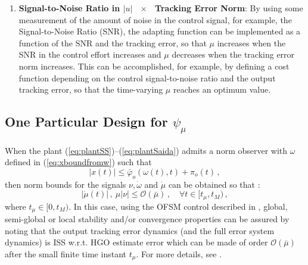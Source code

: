 \documentclass[letterpaper, 10 pt, journal, twocolumn]{IEEEtran}  %
\theoremstyle{plain}
\theoremstyle{definition}
\theoremstyle{remark}
\begin{document}
\begin{enumerate}
\begin{enumerate}
\item {\bf Signal-to-Noise Ratio in $|u|$ \  $\times$ \ Tracking Error Norm}: By using some measurement of the amount of noise in the control signal, for example, the Signal-to-Noise Ratio (SNR), the adapting function can be implemented as a function of the SNR and the tracking error, so that $\mu$ increases when the SNR in the control effort increases and $\mu$ decreases when the tracking error norm increases. This can be accomplished, for example, by defining a cost function depending on the control signal-to-noise ratio and the output tracking error, so that the time-varying $\mu$ reaches an optimum value.
\end{enumerate}

 
\end{enumerate}



\subsection{One Particular Design for $\psi_\mu$}

When the plant (\ref{eq:plantSS})--(\ref{eq:plantSaida}) admits a norm observer with $\omega$ defined in (\ref{eq:xboundfromw}) such that 
%
\begin{equation}
|x(t)| \leq \bar{\varphi}_o(\omega(t),t) + \pi_o(t)\,,\label{eq:xboundfromw1}
\end{equation}
%
then norm bounds for the signals $\nu, \dot{\omega}$ and $\dot{\mu}$ can be obtained so that \cite{POH:2011}:
%
\begin{equation}
|\dot{\mu}(t)|\,, \ \mu |\nu| \leq \mathcal{O}(\bar{\mu})\,, \quad
\forall t \in [t_\mu,t_M)\,, \label{eq:mudotmunu1}
\end{equation}
%
where $t_\mu \in [0,t_M)$. In this case, using the OFSM control described in \cite{POH:2011}, global, semi-global or local stability and/or convergence properties can be assured by noting that the output tracking error dynamics (and the full error system dynamics) is ISS w.r.t. HGO estimate error  which can be made of order $\mathcal{O}(\bar{\mu})$ after the small finite time instant $t_\mu$. For more details, see \cite{POH:2011}.
\end{document}
